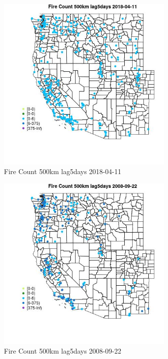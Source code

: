 \begin{figure} 
\centering  
\includegraphics[width=0.77\textwidth]{Code_Outputs/Report_ML_input_PM25_Step4_part_e_de_duplicated_aves_compiled_2019-05-18wNAs_MapObsFire_Count_500km_lag5days2018-04-11.jpg} 
\caption{\label{fig:Report_ML_input_PM25_Step4_part_e_de_duplicated_aves_compiled_2019-05-18wNAsMapObsFire_Count_500km_lag5days2018-04-11}Fire Count 500km lag5days 2018-04-11} 
\end{figure} 
 

\clearpage 

\begin{figure} 
\centering  
\includegraphics[width=0.77\textwidth]{Code_Outputs/Report_ML_input_PM25_Step4_part_e_de_duplicated_aves_compiled_2019-05-18wNAs_MapObsFire_Count_500km_lag5days2008-09-22.jpg} 
\caption{\label{fig:Report_ML_input_PM25_Step4_part_e_de_duplicated_aves_compiled_2019-05-18wNAsMapObsFire_Count_500km_lag5days2008-09-22}Fire Count 500km lag5days 2008-09-22} 
\end{figure} 
 

